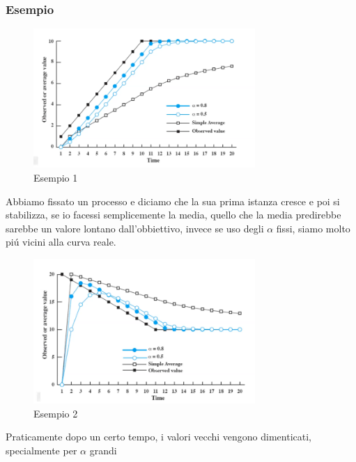 \documentclass[11pt]{article}
\begin{document}
    \subsubsection*{Esempio}
    \begin{figure}[H]
        \centering
        \includegraphics[width=0.75\textwidth]{immagini/EsempioExponentialAveraging}
        \caption{Esempio 1}
    \end{figure}
    Abbiamo fissato un processo e diciamo che la sua prima istanza cresce e poi si stabilizza, se io facessi
    semplicemente la media, quello che la media predirebbe sarebbe un valore lontano dall'obbiettivo, invece
    se uso degli $\alpha$ fissi, siamo molto piú vicini alla curva reale.
    \begin{figure}[H]
        \centering
        \includegraphics[width=0.75\textwidth]{immagini/EsempioExponentialAveraging2}
        \caption{Esempio 2}
    \end{figure}
    Praticamente dopo un certo tempo, i valori vecchi vengono dimenticati, specialmente per $\alpha$ grandi
\end{document}
